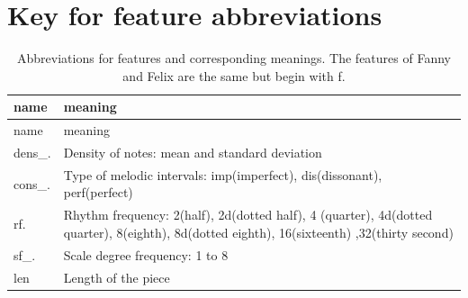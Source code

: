 \documentclass[12pt,twoside]{reedthesis}
\theoremstyle{definition}
\theoremstyle{definition}
\theoremstyle{definition}
\theoremstyle{remark}
\begin{document}
\section{Key for feature
abbreviations}\label{key-for-feature-abbreviations}
\begin{longtable}[]{@{}ll@{}}
\caption{Abbreviations for features and corresponding meanings. The
features of Fanny and Felix are the same but begin with
f.}\tabularnewline
\toprule
\begin{minipage}[b]{0.11\columnwidth}\raggedright\strut
name\strut
\end{minipage} & \begin{minipage}[b]{0.83\columnwidth}\raggedright\strut
meaning\strut
\end{minipage}\tabularnewline
\midrule
\endfirsthead
\toprule
\begin{minipage}[b]{0.11\columnwidth}\raggedright\strut
name\strut
\end{minipage} & \begin{minipage}[b]{0.83\columnwidth}\raggedright\strut
meaning\strut
\end{minipage}\tabularnewline
\midrule
\endhead
\begin{minipage}[t]{0.11\columnwidth}\raggedright\strut
dens\_.\strut
\end{minipage} & \begin{minipage}[t]{0.83\columnwidth}\raggedright\strut
Density of notes: mean and standard deviation\strut
\end{minipage}\tabularnewline
\begin{minipage}[t]{0.11\columnwidth}\raggedright\strut
cons\_.\strut
\end{minipage} & \begin{minipage}[t]{0.83\columnwidth}\raggedright\strut
Type of melodic intervals: imp(imperfect), dis(dissonant),
perf(perfect)\strut
\end{minipage}\tabularnewline
\begin{minipage}[t]{0.11\columnwidth}\raggedright\strut
rf.\strut
\end{minipage} & \begin{minipage}[t]{0.83\columnwidth}\raggedright\strut
Rhythm frequency: 2(half), 2d(dotted half), 4 (quarter), 4d(dotted
quarter), 8(eighth), 8d(dotted eighth), 16(sixteenth) ,32(thirty
second)\strut
\end{minipage}\tabularnewline
\begin{minipage}[t]{0.11\columnwidth}\raggedright\strut
sf\_.\strut
\end{minipage} & \begin{minipage}[t]{0.83\columnwidth}\raggedright\strut
Scale degree frequency: 1 to 8\strut
\end{minipage}\tabularnewline
\begin{minipage}[t]{0.11\columnwidth}\raggedright\strut
len\strut
\end{minipage} & \begin{minipage}[t]{0.83\columnwidth}\raggedright\strut
Length of the piece\strut
\end{minipage}\tabularnewline
\bottomrule
\end{longtable}
\end{document}
